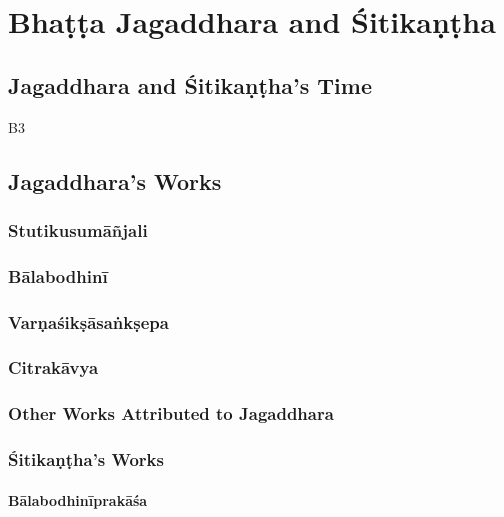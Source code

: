 \chapter{Bhaṭṭa Jagaddhara and Śitikaṇṭha}

\section{Jagaddhara and Śitikaṇṭha's Time}

\gls{B3}

\section{Jagaddhara's Works}

\subsection{Stutikusumāñjali}

\subsection{Bālabodhinī}

\subsection{Varṇaśikṣāsaṅkṣepa}

\subsection{Citrakāvya}

\subsection{Other Works Attributed to Jagaddhara}

\subsection{Śitikaṇṭha's Works}

\subsubsection{Bālabodhinīprakāśa}

